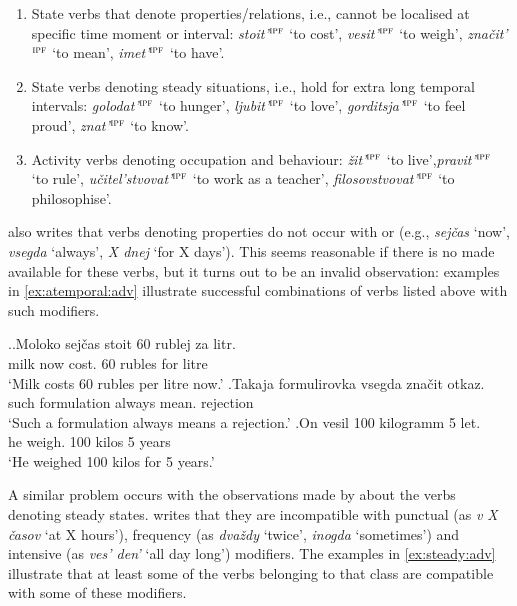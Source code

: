 \begin{enumerate}
\item State verbs that denote  properties/relations, i.e., cannot be localised at specific time moment or interval: \textit{stoit'}$^{\textsc{ipf}}$ `to cost', \textit{vesit'}$^{\textsc{ipf}}$ `to weigh', \textit{zna\v{c}it'}$^{\textsc{ipf}}$ `to mean', \textit{imet'}$^{\textsc{ipf}}$ `to have'.
\item State verbs denoting steady situations,  i.e., hold for extra long temporal intervals: \textit{golodat'}$^{\textsc{ipf}}$ `to hunger', \textit{ljubit'}$^{\textsc{ipf}}$ `to love', \textit{gorditsja'}$^{\textsc{ipf}}$ `to feel proud', \textit{znat'}$^{\textsc{ipf}}$ `to know'.
\item Activity verbs denoting occupation and behaviour: \textit{\v{z}it'}$^{\textsc{ipf}}$ `to live',\linebreak \textit{pravit'}$^{\textsc{ipf}}$ `to rule', \textit{u\v{c}itel'stvovat'}$^{\textsc{ipf}}$ `to work as a teacher', \textit{filosovstvovat'}$^{\textsc{ipf}}$ `to philosophise'.
\end{enumerate}

\citet{Paducheva:96} also writes that verbs denoting  properties do not occur with  or  (e.g., \textit{sej\v{c}as} `now', \textit{vsegda} `always', \textit{X dnej} `for X days'). This seems reasonable if there is no  made available for these verbs, but it turns out to be an invalid observation: examples in \ref{ex:atemporal:adv} illustrate successful combinations of verbs listed above with such modifiers.


\ex.\label{ex:atemporal:adv}\ag.Moloko sej\v{c}as stoit 60 rublej za litr.\\
milk now cost. 60 rubles for litre\\
\trans `Milk costs 60 rubles per litre now.'
\bg.Takaja formulirovka vsegda zna\v{c}it otkaz.\\
such formulation always mean. rejection\\
\trans `Such a formulation always means a rejection.'
\bg.On vesil 100 kilogramm 5 let.\\
he weigh. 100 kilos 5 years\\
\trans `He weighed 100 kilos for 5 years.'

A similar problem occurs with the observations made by \citet{Paducheva:96} about the verbs denoting steady states. \citet{Paducheva:96} writes that they are incompatible with punctual (as \textit{v X \v{c}asov} `at X hours'), frequency (as \textit{dva\v{z}dy} `twice', \textit{inogda} `sometimes') and intensive   (as \textit{ves' den'} `all day long') modifiers. The examples in \ref{ex:steady:adv} illustrate that at least some of the verbs belonging to that class are compatible with some of these modifiers.

